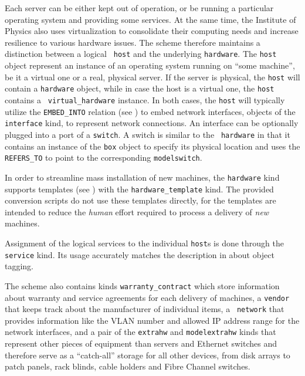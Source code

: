 \documentclass[deska]{subfiles}
\begin{document}
Each server can be either kept out of operation, or be running a particular operating system and providing some
services.  At the same time, the Institute of Physics also uses virtualization to consolidate their computing needs and
increase resilience to various hardware issues.  The scheme therefore maintains a distinction between a logical {\tt
host} and the underlying {\tt hardware}.  The {\tt host} object represent an instance of an operating system running on
``some machine'', be it a virtual one or a real, physical server.  If the server is physical, the {\tt host} will
contain a {\tt hardware} object, while in case the host is a virtual one, the {\tt host} contains a {\tt
virtual\_hardware} instance.  In both cases, the {\tt host} will typically utilize the {\tt EMBED\_INTO} relation (see
) to embed network interfaces, objects of the {\tt interface} kind, to represent network
connections.  An interface can be optionally plugged into a port of a {\tt switch}.  A switch is similar to the {\tt
hardware} in that it contains an instance of the {\tt box} object to specify its physical location and uses the {\tt
REFERS\_TO} to point to the corresponding {\tt modelswitch}.

In order to streamline mass installation of new machines, the {\tt hardware} kind supports templates (see
) with the {\tt hardware\_template} kind.  The provided conversion scripts do not use
these templates directly, for the templates are intended to reduce the {\em human} effort required to process a delivery
of {\em new} machines.

Assignment of the logical services to the individual {\tt host}s is done through the {\tt service} kind.  Its usage
accurately matches the description in  about object tagging.

The scheme also contains kinds {\tt warranty\_contract} which store information about warranty and service agreements
for each delivery of machines, a {\tt vendor} that keeps track about the manufacturer of individual items, a {\tt
network} that provides information like the VLAN number and allowed IP address range for the network interfaces, and a
pair of the {\tt extrahw} and {\tt modelextrahw} kinds that represent other pieces of equipment than servers and
Ethernet switches and therefore serve as a ``catch-all'' storage for all other devices, from disk arrays to patch
panels, rack blinds, cable holders and Fibre Channel switches.
\end{document}
